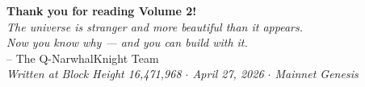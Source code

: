 \documentclass[11pt,a4paper]{article}
\begin{document}
\vspace{2cm}

\begin{center}
\Large
\textbf{Thank you for reading Volume 2!}\\
\vspace{0.5cm}
\large
\textit{The universe is stranger and more beautiful than it appears.}\\
\textit{Now you know why --- and you can build with it.}\\
\vspace{0.5cm}
-- The Q-NarwhalKnight Team\\
\vspace{0.3cm}
\normalsize\textit{Written at Block Height 16,471,968 $\cdot$ April 27, 2026 $\cdot$ Mainnet Genesis}
\end{center}
\end{document}
